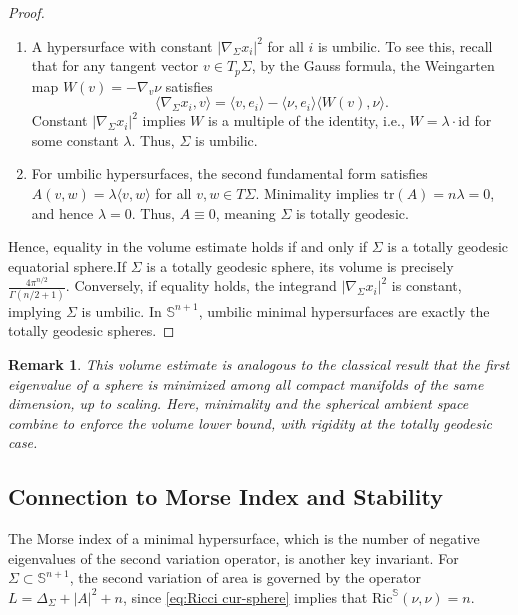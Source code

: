\documentclass[a4, 12pt]{amsart}
\numberwithin{equation}{section} \numberwithin{equation}{section}
\newtheorem{rem}{Remark}[section]{\bfseries\upshape}
\begin{document}
\begin{proof}
\begin{enumerate}
    \item[(iii)] A hypersurface with constant $|\nabla_\Sigma x_i|^2$ for all $i$ is umbilic. To see this, recall that for any tangent vector $v \in T_p\Sigma$, by the Gauss formula, the Weingarten map $W(v) = -\nabla_v \nu$ satisfies $$\langle \nabla_\Sigma x_i, v \rangle = \langle v, e_i \rangle - \langle \nu, e_i \rangle \langle W(v), \nu \rangle.$$ Constant $|\nabla_\Sigma x_i|^2$ implies $W$ is a multiple of the identity, i.e., $W = \lambda \cdot \text{id}$ for some constant $\lambda$. Thus, $\Sigma$ is umbilic.

    \item[(iv)] For umbilic hypersurfaces, the second fundamental form satisfies $A(v, w) = \lambda \langle v, w \rangle$ for all $v, w \in T\Sigma$. Minimality implies $\text{tr}(A) = n\lambda = 0$, and hence $\lambda = 0$. Thus, $A \equiv 0$, meaning $\Sigma$ is totally geodesic.
\end{enumerate}
Hence, equality in the volume estimate holds if and only if $\Sigma$ is a totally geodesic equatorial sphere.If $\Sigma$ is a totally geodesic sphere, its volume is precisely $\frac{4\pi^{n/2}}{\Gamma(n/2 + 1)}$. Conversely, if equality holds, the integrand $|\nabla_\Sigma x_i|^2$ is constant, implying $\Sigma$ is umbilic. In $\mathbb{S}^{n+1}$, umbilic minimal hypersurfaces are exactly the totally geodesic spheres.
\end{proof}

\begin{rem}
This volume estimate is analogous to the classical result that the first eigenvalue of a sphere is minimized among all compact manifolds of the same dimension, up to scaling. Here, minimality and the spherical ambient space combine to enforce the volume lower bound, with rigidity at the totally geodesic case.
\end{rem}

\subsection{Connection to Morse Index and Stability}

The Morse index of a minimal hypersurface, which is the number of negative eigenvalues of the second variation operator, is another key invariant. For $\Sigma \subset \mathbb{S}^{n+1}$, the second variation of area is governed by the operator $L = \Delta_\Sigma + |A|^2 + n$, since \eqref{eq:Ricci cur-sphere} implies that $\text{Ric}^\mathbb{S}(\nu,\nu) = n$.
\end{document}
